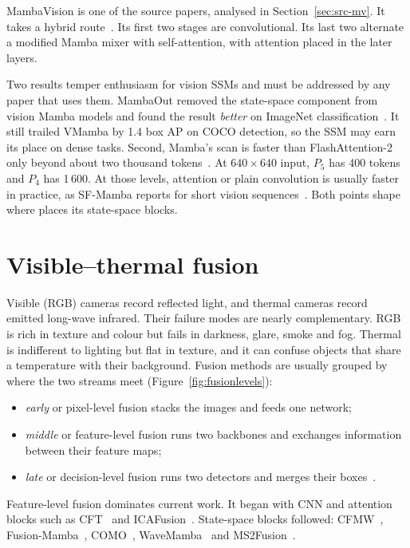 MambaVision is one of the source papers, analysed in
Section~\ref{sec:src-mv}. It takes a hybrid route~\citep{hatamizadeh2025mambavision}.
Its first two stages are convolutional. Its last two alternate a modified
Mamba mixer with self-attention, with attention placed in the later layers.

Two results temper enthusiasm for vision SSMs and must be addressed by any
paper that uses them. MambaOut removed the state-space component from
vision Mamba models and found the result \emph{better} on ImageNet
classification~\citep{yu2025mambaout}. It still trailed VMamba by 1.4 box AP
on COCO detection, so the SSM may earn its place on dense tasks. Second,
Mamba's scan is faster than FlashAttention-2 only beyond about two thousand
tokens~\citep{gu2023mamba,dao2023flash2}. At $640\times640$ input, $P_5$ has
400 tokens and $P_4$ has 1\,600. At those levels, attention or plain
convolution is usually faster in practice, as SF-Mamba reports for short
vision sequences~\citep{sfmamba2026}. Both points shape where \method{}
places its state-space blocks.



\section{Visible--thermal fusion}
\label{sec:fusion}

Visible (RGB) cameras record reflected light, and thermal cameras record
emitted long-wave infrared. Their failure modes are nearly complementary.
RGB is rich in texture and colour but fails in darkness, glare, smoke and
fog. Thermal is indifferent to lighting but flat in texture, and it can
confuse objects that share a temperature with their background. Fusion
methods are usually grouped by where the two streams meet
(Figure~\ref{fig:fusionlevels}):
\begin{itemize}
  \item \emph{early} or pixel-level fusion stacks the images and feeds one
        network;
  \item \emph{middle} or feature-level fusion runs two backbones and
        exchanges information between their feature maps;
  \item \emph{late} or decision-level fusion runs two detectors and merges
        their boxes~\citep{chen2022proben}.
\end{itemize}
Feature-level fusion dominates current work. It began with CNN and
attention blocks such as CFT~\citep{qingyun2021cft} and
ICAFusion~\citep{shen2024icafusion}. State-space blocks followed: CFMW~\citep{li2025cfmw},
Fusion-Mamba~\citep{dong2025fusionmamba}, COMO~\citep{como2024},
WaveMamba~\citep{wavemamba2025} and MS2Fusion~\citep{ms2fusion2025}.

